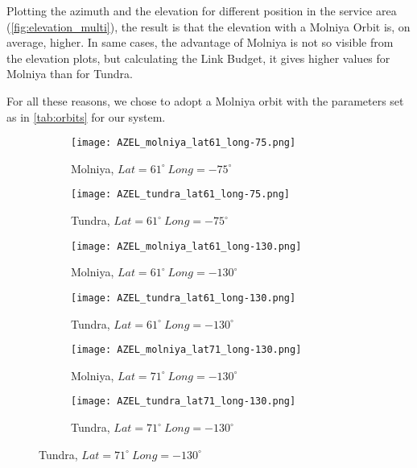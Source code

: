 Plotting the azimuth and the elevation for different position in the service area (\autoref{fig:elevation_multi}), the result is that the elevation with a Molniya Orbit is, on average, higher. In same cases, the advantage of Molniya is not so visible from the elevation plots, but calculating the Link Budget, it gives higher values for Molniya than for Tundra.

For all these reasons, we chose to adopt a Molniya orbit with the parameters set as in \autoref{tab:orbits} for our system.

\begin{figure}[h]
	\begin{subfigure}{.5\textwidth}
	\centering
	\texttt{[image: AZEL\_molniya\_lat61\_long-75.png]}
	\caption{Molniya, $Lat = 61^\circ ~ Long = -75^\circ$}
	\end{subfigure}
	\begin{subfigure}{.5\textwidth}
	\centering
	\texttt{[image: AZEL\_tundra\_lat61\_long-75.png]}
	\caption{Tundra, $Lat = 61^\circ ~ Long = -75^\circ$}
	\end{subfigure}
	\vspace{0.5cm}
	\begin{subfigure}{.5\textwidth}
	\centering
	\texttt{[image: AZEL\_molniya\_lat61\_long-130.png]}
	\caption{Molniya, $Lat = 61^\circ ~ Long = -130^\circ$}
	\end{subfigure}
	\begin{subfigure}{.5\textwidth}
	\centering
	\texttt{[image: AZEL\_tundra\_lat61\_long-130.png]}
	\caption{Tundra, $Lat = 61^\circ ~ Long = -130^\circ$}
	\end{subfigure}
	\vspace{0.5cm}
	\begin{subfigure}{.5\textwidth}
	\centering
	\texttt{[image: AZEL\_molniya\_lat71\_long-130.png]}
	\caption{Molniya, $Lat = 71^\circ ~ Long = -130^\circ$}
	\end{subfigure}
	\begin{subfigure}{.5\textwidth}
	\centering
	\texttt{[image: AZEL\_tundra\_lat71\_long-130.png]}
	\caption{Tundra, $Lat = 71^\circ ~ Long = -130^\circ$}
	\end{subfigure}
\end{figure}
